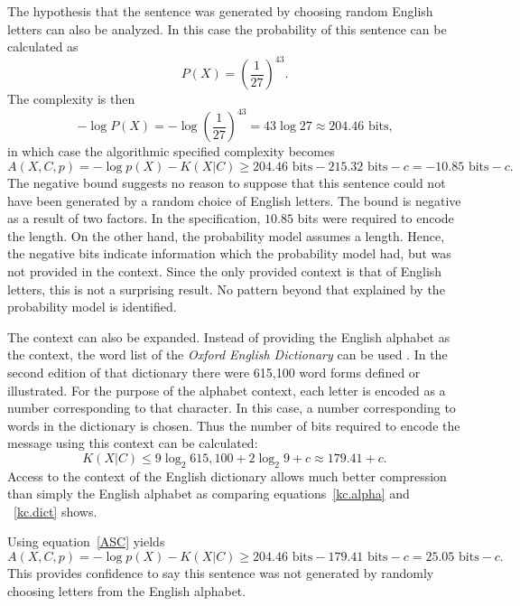 The hypothesis that the sentence was generated by choosing random English letters can also be analyzed.
In this case the probability of this sentence can be calculated as
\begin{equation}
    P(X) = \left(\frac{1}{27}\right)^{43} \mbox{.}
\end{equation}
The complexity is then
\begin{equation}
    -\log P(X) = -\log \left(\frac{1}{27}\right)^{43} = 43 \log 27 \approx 204.46 \mbox{ bits,}
\end{equation}
in which case the algorithmic specified complexity becomes
\begin{equation}
    A(X,C,p) = - \log p(X) - K(X|C) \geq 204.46 \mbox{ bits} - 215.32 \mbox{ bits} - c = -10.85 \mbox{ bits} - c \mbox{.}
\end{equation}
The negative bound suggests no reason to suppose that this sentence could not have been generated by a random choice of English letters.
The bound is negative as a result of two factors.
In the specification, $10.85$ bits were required to encode the length.
On the other hand, the probability model assumes a length.
Hence, the negative bits indicate information which the probability model had, but was not provided in the context.
Since the only provided context is that of English letters, this is not a surprising result.
No pattern beyond that explained by the probability model is identified.

The context can also be expanded.
Instead of providing the English alphabet as the context, the word list of the \textit{Oxford English Dictionary} can be used \citep{Oxford2012}.
In the second edition of that dictionary there were 615,100 word forms defined or illustrated.
For the purpose of the alphabet context, each letter is encoded as a number corresponding to that character.
In this case, a number corresponding to words in the dictionary is chosen.
Thus the number of bits required to encode the message using this context can be calculated:
\begin{equation}
    \label{kc.dict}
    K(X|C) \leq 9 \log_2  615,100 + 2 \log_2 9 + c \approx 179.41 + c \mbox{.}
\end{equation}
Access to the context of the English dictionary allows much better compression than simply the English alphabet as comparing equations~\ref{kc.alpha} and ~\ref{kc.dict} shows.

Using equation~\ref{ASC} yields
\begin{equation}
    A(X,C,p) = - \log p(X) - K(X|C) \geq 204.46 \mbox{ bits} - 179.41 \mbox{ bits} - c = 25.05 \mbox{ bits} - c \mbox{.}
\end{equation}
This provides confidence to say this sentence was not generated by randomly choosing letters from the English alphabet.

